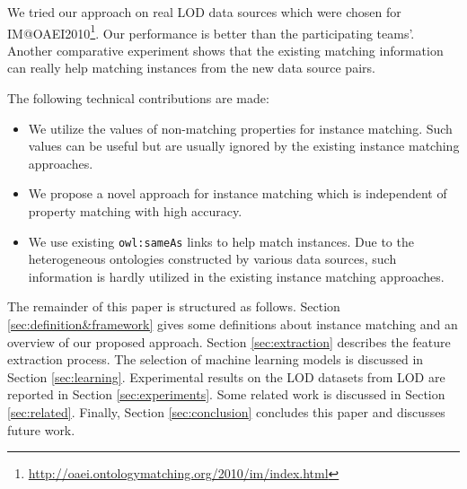 We tried our approach on real LOD data sources which were chosen for IM@OAEI2010\footnote{\url{http://oaei.ontologymatching.org/2010/im/index.html}}. Our performance is better than the participating teams'. Another comparative experiment shows that the existing matching information can really help matching instances from the new data source pairs.

The following technical contributions are made:
\begin{itemize}
\item We utilize the values of non-matching properties for instance matching. Such values can be useful but are usually ignored by the existing instance matching approaches.
\item We propose a novel approach for instance matching which is independent of property matching with high accuracy.
\item We use existing \texttt{owl:sameAs} links to help match instances. Due to the heterogeneous ontologies constructed by various data sources, such information is hardly utilized in the existing instance matching approaches.
\end{itemize}

The remainder of this paper is structured as follows. Section \ref{sec:definition&framework} gives some definitions about instance matching and an overview of our proposed approach. Section \ref{sec:extraction} describes the feature extraction process. The selection of machine learning models is discussed in Section \ref{sec:learning}. Experimental results on the LOD datasets from LOD are reported in Section \ref{sec:experiments}. Some related work is discussed in Section \ref{sec:related}. Finally, Section \ref{sec:conclusion} concludes this paper and discusses future work. 
